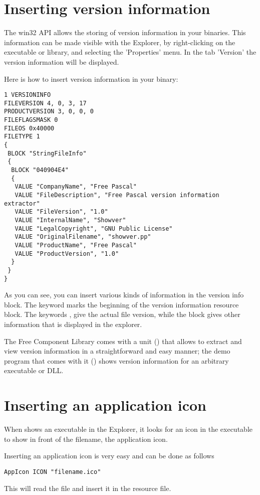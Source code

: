 \section{Inserting version information}

The win32 API allows the storing of version information in your binaries.
This information can be made visible with the \windows Explorer, by
right-clicking on the executable or library, and selecting the
'Properties' menu. In the tab 'Version' the version information will
be displayed.

Here is how to insert version information in your binary:
\begin{verbatim}
1 VERSIONINFO
FILEVERSION 4, 0, 3, 17
PRODUCTVERSION 3, 0, 0, 0
FILEFLAGSMASK 0
FILEOS 0x40000
FILETYPE 1
{
 BLOCK "StringFileInfo"
 {
  BLOCK "040904E4"
  {
   VALUE "CompanyName", "Free Pascal"
   VALUE "FileDescription", "Free Pascal version information extractor"
   VALUE "FileVersion", "1.0"
   VALUE "InternalName", "Showver"
   VALUE "LegalCopyright", "GNU Public License"
   VALUE "OriginalFilename", "showver.pp"
   VALUE "ProductName", "Free Pascal"
   VALUE "ProductVersion", "1.0"
  }
 }
}
\end{verbatim}
As you can see, you can insert various kinds of information in the version info
block. The keyword  marks the beginning of the version
information resource block. The keywords ,
 give the actual file version, while the block
 gives other information that is displayed in the
explorer.

The Free Component Library comes with a unit () that allows
to extract and view version information in a straightforward and easy manner;
the demo program that comes with it () shows version information
for an arbitrary executable or DLL.

\section{Inserting an application icon}

When \windows shows an executable in the Explorer, it looks for an icon
in the executable to show in front of the filename, the application
icon.

Inserting an application icon is very easy and can be done as follows
\begin{verbatim}
AppIcon ICON "filename.ico"
\end{verbatim}
This will read the file  and insert it in the
resource file.

